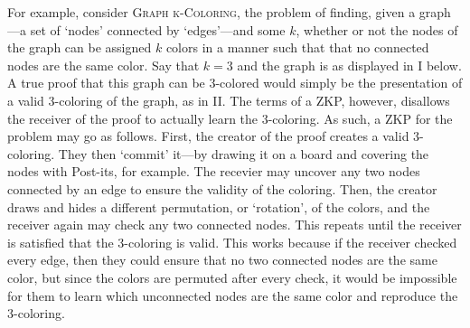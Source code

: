 \documentclass{article}
\begin{document}
For example, consider \textsc{Graph k-Coloring}, the problem of finding, given a graph---a set of `nodes' connected by `edges'---and some $k$, whether or not the nodes of the graph can be assigned $k$ colors in a manner such that that no connected nodes are the same color. Say that $k = 3$ and the graph is as displayed in I below. A true proof that this graph can be 3-colored would simply be the presentation of a valid 3-coloring of the graph, as in II. The terms of a ZKP, however, disallows the receiver of the proof to actually learn the 3-coloring. As such, a ZKP for the problem may go as follows. First, the creator of the proof creates a valid 3-coloring. They then `commit' it---by drawing it on a board and covering the nodes with Post-its, for example. The recevier may uncover any two nodes connected by an edge to ensure the validity of the coloring. Then, the creator draws and hides a different permutation, or `rotation', of the colors, and the receiver again may check any two connected nodes. This repeats until the receiver is satisfied that the 3-coloring is valid. This works because if the receiver checked every edge, then they could ensure that no two connected nodes are the same color, but since the colors are permuted after every check, it would be impossible for them to learn which unconnected nodes are the same color and reproduce the 3-coloring.
\end{document}

